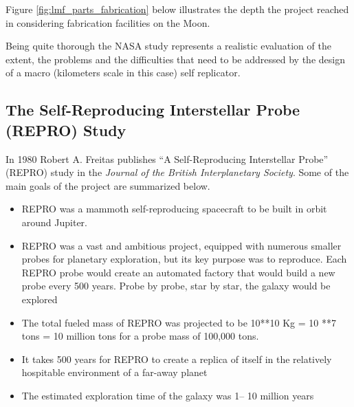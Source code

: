 Figure \ref{fig:lmf_parts_fabrication} below illustrates the depth the project reached in considering
fabrication facilities on the Moon.


Being quite thorough the NASA study represents a realistic evaluation of
the extent, the problems and the difficulties that need to be addressed
by the design of a macro (kilometers scale in this case) self
replicator.

\subsection[The Self{}-Reproducing Interstellar Probe (REPRO) Study]{The
Self-Reproducing Interstellar Probe (REPRO) Study}

\hypertarget{RefHeading3156306210128}{}In 1980 Robert A. Freitas
publishes  “A Self-Reproducing Interstellar Probe” (REPRO) study  in
the \textit{Journal of the British Interplanetary Society}. Some of the
main goals of the project are summarized below.

\begin{itemize}
\item REPRO was a mammoth self-reproducing spacecraft to be built in
orbit around Jupiter.
\item REPRO was a vast and ambitious project, equipped with numerous
smaller probes for planetary exploration, but its key purpose was to
reproduce. Each REPRO probe would create an automated factory that
would build a new probe every 500 years. Probe by probe, star by star,
the galaxy would be explored 
\item The total fueled mass of REPRO was projected to be 10**10 Kg = 10
**7 tons = 10 million tons for a probe mass of 100,000 tons.
\item It takes 500 years for REPRO to create a replica of itself in the
relatively hospitable environment of a far-away planet
\item The estimated exploration time of the galaxy was 1– 10 million
years
\end{itemize}

